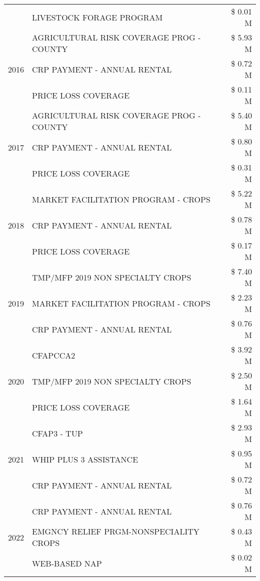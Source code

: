 \begin{tabular}{llr}
 & LIVESTOCK FORAGE PROGRAM & \$ 0.01 M \\
\cline{1-3}
\multirow[t]{3}{*}{2016} & AGRICULTURAL RISK COVERAGE PROG - COUNTY & \$ 5.93 M \\
 & CRP PAYMENT - ANNUAL RENTAL & \$ 0.72 M \\
 & PRICE LOSS COVERAGE & \$ 0.11 M \\
\cline{1-3}
\multirow[t]{3}{*}{2017} & AGRICULTURAL RISK COVERAGE PROG - COUNTY & \$ 5.40 M \\
 & CRP PAYMENT - ANNUAL RENTAL & \$ 0.80 M \\
 & PRICE LOSS COVERAGE & \$ 0.31 M \\
\cline{1-3}
\multirow[t]{3}{*}{2018} & MARKET FACILITATION PROGRAM - CROPS & \$ 5.22 M \\
 & CRP PAYMENT - ANNUAL RENTAL & \$ 0.78 M \\
 & PRICE LOSS COVERAGE & \$ 0.17 M \\
\cline{1-3}
\multirow[t]{3}{*}{2019} & TMP/MFP 2019 NON SPECIALTY CROPS & \$ 7.40 M \\
 & MARKET FACILITATION PROGRAM - CROPS & \$ 2.23 M \\
 & CRP PAYMENT - ANNUAL RENTAL & \$ 0.76 M \\
\cline{1-3}
\multirow[t]{3}{*}{2020} & CFAPCCA2 & \$ 3.92 M \\
 & TMP/MFP 2019 NON SPECIALTY CROPS & \$ 2.50 M \\
 & PRICE LOSS COVERAGE & \$ 1.64 M \\
\cline{1-3}
\multirow[t]{3}{*}{2021} & CFAP3 - TUP & \$ 2.93 M \\
 & WHIP PLUS 3 ASSISTANCE & \$ 0.95 M \\
 & CRP PAYMENT - ANNUAL RENTAL & \$ 0.72 M \\
\cline{1-3}
\multirow[t]{3}{*}{2022} & CRP PAYMENT - ANNUAL RENTAL & \$ 0.76 M \\
 & EMGNCY RELIEF PRGM-NONSPECIALITY CROPS & \$ 0.43 M \\
 & WEB-BASED NAP & \$ 0.02 M \\
\cline{1-3}
\bottomrule
\end{tabular}
